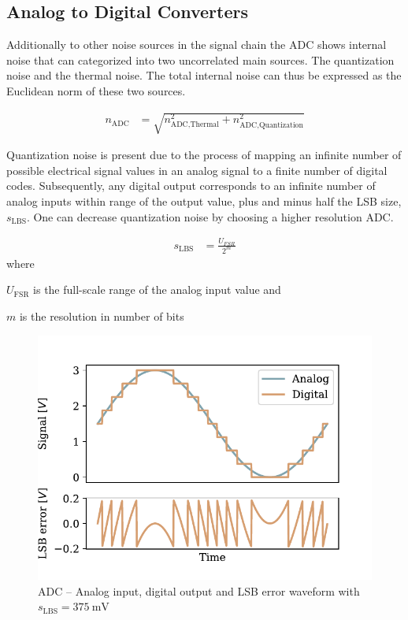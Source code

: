 \subsection{Analog to Digital Converters}

Additionally to other noise sources in the signal chain the \ac{ADC} shows internal noise that can categorized into two uncorrelated main sources. The quantization noise and the thermal noise. The total internal noise can thus be expressed as the Euclidean norm of these two sources.

\begin{align}
    n_\text{ADC} &= \sqrt{n_{\text{ADC},\text{Thermal}}^2 + n_{\text{ADC},\text{Quantization}}^2}
\end{align}

Quantization noise is present due to the process of mapping an infinite number of possible electrical signal values in an analog signal to a finite number of digital codes. Subsequently, any digital output corresponds to an infinite number of analog inputs within range of the output value, plus and minus half the \ac{LSB} size, $s_\text{LBS}$. One can decrease quantization noise by choosing a higher resolution \ac{ADC}.

\begin{align}
    s_\text{LBS} &= \frac{U_{FSR}}{2^m}
\end{align}
where
\begin{description}[topsep=0ex, noitemsep]
    \item $U_{\text{FSR}}$ is the full-scale range of the analog input value and
    \item $m$ is the resolution in number of bits
\end{description}

\begin{figure}[!htb]
    \centering
    \includegraphics[scale=0.72]{figures/electronics/adc/plot_lsberr}
    \caption[ADC LSB waveform]{\ac{ADC} -- Analog input, digital output and \ac{LSB} error waveform with $s_\text{LBS} = \SI{375}{\milli\volt}$\cite{hall2020fund}}
    \label{fig:plot_lsberr}
\end{figure}

